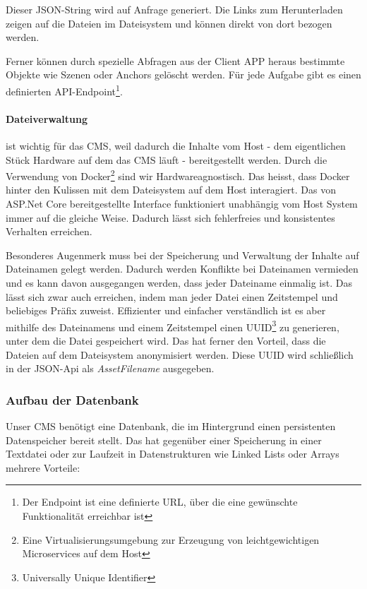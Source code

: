 \documentclass[titlepage, a4paper, 11pt]{scrartcl}
\begin{document}
        Dieser JSON-String wird auf Anfrage generiert. Die Links zum Herunterladen zeigen auf die Dateien im Dateisystem und können direkt von dort bezogen werden.

        Ferner können durch spezielle Abfragen aus der Client APP heraus bestimmte Objekte wie Szenen oder Anchors gelöscht werden. 
        Für jede Aufgabe gibt es einen definierten API-Endpoint\footnote{Der Endpoint ist eine definierte URL, über die eine gewünschte Funktionalität erreichbar ist}.

        \paragraph{Dateiverwaltung} ist wichtig für das CMS, weil dadurch die Inhalte vom Host - dem eigentlichen Stück Hardware auf dem das CMS läuft - bereitgestellt werden.
        Durch die Verwendung von Docker\footnote{Eine Virtualisierungsumgebung zur Erzeugung von leichtgewichtigen Microservices auf dem Host} sind wir Hardwareagnostisch.
        Das heisst, dass Docker hinter den Kulissen mit dem Dateisystem auf dem Host interagiert. Das von ASP.Net Core bereitgestellte Interface funktioniert unabhängig
        vom Host System immer auf die gleiche Weise. Dadurch lässt sich fehlerfreies und konsistentes Verhalten erreichen.

        Besonderes Augenmerk muss bei der Speicherung und Verwaltung der Inhalte auf Dateinamen gelegt werden. Dadurch werden Konflikte bei Dateinamen vermieden und es kann
        davon ausgegangen werden, dass jeder Dateiname einmalig ist. Das lässt sich zwar auch erreichen, indem man jeder Datei einen Zeitstempel und beliebiges Präfix zuweist.
        Effizienter und einfacher verständlich ist es aber mithilfe des Dateinamens und einem Zeitstempel einen UUID\footnote{Universally Unique Identifier} zu generieren, unter dem die Datei gespeichert wird.
        Das hat ferner den Vorteil, dass die Dateien auf dem Dateisystem anonymisiert werden. Diese UUID wird schließlich in der JSON-Api als \textit{AssetFilename} ausgegeben.       

      \subsubsection{Aufbau der Datenbank}

        Unser CMS benötigt eine Datenbank, die im Hintergrund einen persistenten Datenspeicher bereit stellt.
        Das hat gegenüber einer Speicherung in einer Textdatei oder zur Laufzeit in Datenstrukturen wie Linked Lists oder Arrays mehrere Vorteile:
\end{document}
